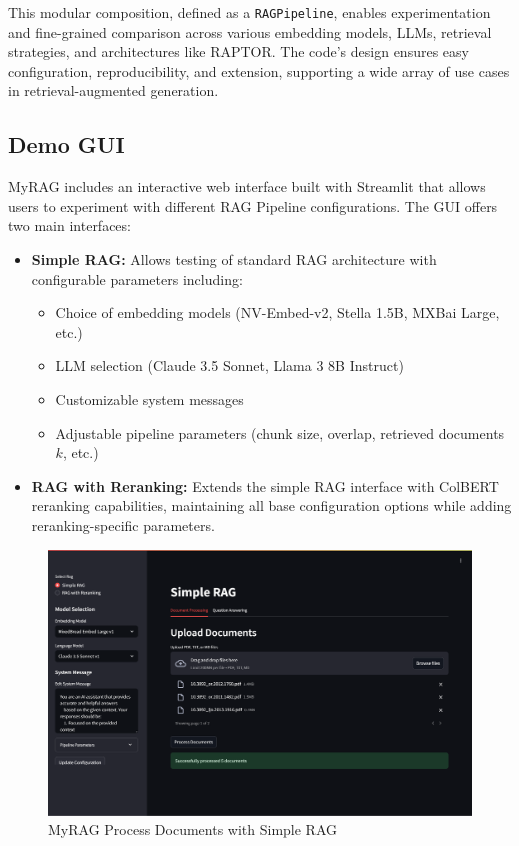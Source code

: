 \documentclass{scrartcl}
\begin{document}
This modular composition, defined as a \texttt{RAGPipeline}, enables experimentation and fine-grained comparison across various embedding models, LLMs, retrieval strategies, and architectures like RAPTOR. The code’s design ensures easy configuration, reproducibility, and extension, supporting a wide array of use cases in retrieval-augmented generation.

\subsection{Demo GUI}
MyRAG includes an interactive web interface built with Streamlit that allows users to experiment with different RAG Pipeline configurations. The GUI offers two main interfaces:

\begin{itemize}
    \item \textbf{Simple RAG:} Allows testing of standard RAG architecture with configurable parameters including:
    \begin{itemize}
        \item Choice of embedding models (NV-Embed-v2, Stella 1.5B, MXBai Large, etc.)
        \item LLM selection (Claude 3.5 Sonnet, Llama 3 8B Instruct)
        \item Customizable system messages
        \item Adjustable pipeline parameters (chunk size, overlap, retrieved documents $k$, etc.)
    \end{itemize}
    
    \item \textbf{RAG with Reranking:} Extends the simple RAG interface with ColBERT reranking capabilities, maintaining all base configuration options while adding reranking-specific parameters. 
\end{itemize}

\begin{figure}[H]
    \centering
    \includegraphics[width=\textwidth]{MyRAG_UI_Process_docs.png}
    \caption{MyRAG Process Documents with Simple RAG}
    \label{fig:process_docs}
\end{figure}
\end{document}

